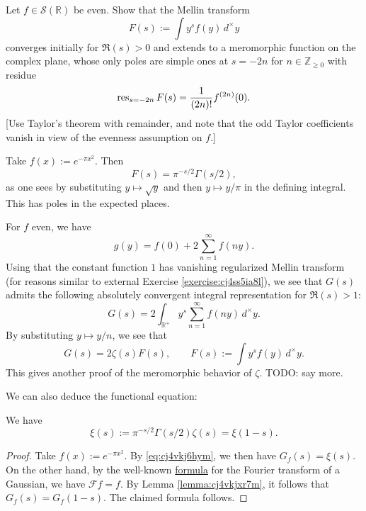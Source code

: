 \documentclass[reqno]{amsart}  \numberwithin{theorem}{section} \numberwithin{equation}{section}
\begin{document}
\begin{exercise}\label{exercise:cj56e5j0b7}
  Let $f \in \mathcal{S}(\mathbb{R})$ be even.  Show that the Mellin transform
  \begin{equation*}
    F(s) := \int y^s f (y) \,d^\times y
  \end{equation*}
  converges initially for $\Re(s) > 0$ and extends to a meromorphic function on the complex plane, whose only poles are simple ones at $s = - 2n$ for $n \in \mathbb{Z}_{\geq 0}$ with residue
  \begin{equation*}
    \operatorname{res}_{s = - 2 n} F(s) = \frac{1}{(2 n)!} f^{(2 n)}(0).
  \end{equation*}
  [Use Taylor's theorem with remainder, and note that the odd Taylor coefficients vanish in view of the evenness assumption on $f$.]
\end{exercise}
\begin{example}\label{example:cj56e5io5n}
  Take $f(x) := e^{- \pi x^2}$.  Then
  \begin{equation}\label{eq:cj4vkj6hym}
    F(s) = \pi^{- s / 2 } \Gamma (s / 2),
  \end{equation}
  as one sees by substituting $y \mapsto \sqrt{y}$ and then $y \mapsto y / \pi$ in the defining integral.  This has poles in the expected places.
\end{example}

For $f$ even, we have
\begin{equation*}
  g(y) = f(0) + 2 \sum_{n = 1 }^\infty f(n y).
\end{equation*}
Using that the constant function $1$ has vanishing regularized Mellin transform (for reasons similar to external Exercise \ref{exercise:cj4ss5ia8l}), we see that $G(s)$ admits the following absolutely convergent integral representation for $\Re(s) > 1$:
\begin{equation*}
  G(s) = 2 \int_{\mathbb{R}^+ } y^s \sum_{n = 1 }^\infty f (n y ) \,d^\times y.
\end{equation*}
By substituting $y \mapsto y / n$, we see that
\begin{equation*}
  G(s) = 2 \zeta(s) F(s), \qquad F(s) := \int y^s f(y) \,d^\times y.
\end{equation*}
This gives another proof of the meromorphic behavior of $\zeta$.  TODO: say more.

We can also deduce the functional equation:
\begin{theorem}\label{theorem:cj56e5im1s}
  We have
  \begin{equation*}
    \xi(s) := \pi^{- s / 2 } \Gamma (s/ 2 ) \zeta(s) = \xi (1 - s).
  \end{equation*}
\end{theorem}
\begin{proof}
  Take $f(x) := e^{- \pi x^2}$.  By \eqref{eq:cj4vkj6hym}, we then have $G_f(s) = \xi(s)$.  On the other hand, by the well-known \href{https://mathworld.wolfram.com/FourierTransformGaussian.html}{formula} for the Fourier transform of a Gaussian, we have $\mathcal{F} f = f$.  By Lemma \ref{lemma:cj4vkjxr7m}, it follows that $G_f (s) = G_f (1 - s)$.  The claimed formula follows.
\end{proof}
\end{document}
